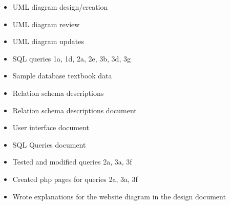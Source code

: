 \begin{itemize}
	\item UML diagram design/creation
	\item UML diagram review
	\item UML diagram updates
	\item SQL queries 1a, 1d, 2a, 2e, 3b, 3d, 3g
	\item Sample database textbook data
	\item Relation schema descriptions
	\item Relation schema descriptions document
	\item User interface document 
	\item SQL Queries document 
	\item Tested and modified queries 2a, 3a, 3f
	\item Created php pages for queries 2a, 3a, 3f
	\item Wrote explanations for the website diagram in the design document

\end{itemize}